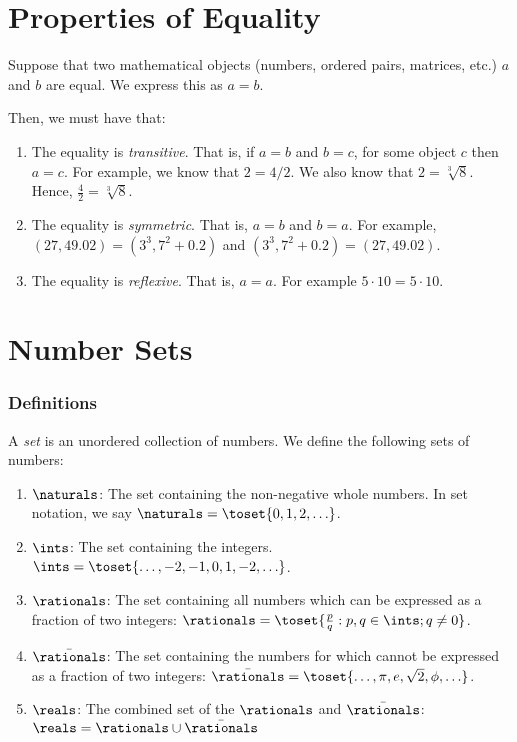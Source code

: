 \section{Properties of Equality}
  Suppose that two mathematical objects (numbers, ordered pairs, matrices, etc.)
  $a$ and $b$ are equal. We express this as $a = b$.

  Then, we must have that:
  \begin{enumerate}[label=(\alph*)]
    \item The equality is \emph{transitive}. That is, if $a = b$ and $b = c$, for some
    object $c$ then $a = c$. For example, we know that $2 = 4/2$. We also know that
    $2 = \sqrt[3]{8}$. Hence, $\frac{4}{2} = \sqrt[3]{8}$.

    \item The equality is \emph{symmetric}. That is, $a = b$ and $b = a$. For example,
    $(27, 49.02) = (3^3, 7^2 + 0.2)$ and $(3^3, 7^2 + 0.2) = (27, 49.02)$.

    \item The equality is \emph{reflexive}. That is, $a = a$. For example $5 \cdot 10 = 5 \cdot 10.$
  \end{enumerate}

\section{Number Sets}
  \subsubsection*{Definitions}
  A \emph{set} is an unordered collection of numbers. We define the following sets of numbers:
  \begin{enumerate}
    \item $\naturals$: The set containing the non-negative whole numbers. In set notation, we say $\naturals = \toset{0, 1, 2, \ldots}$.
    \item $\ints$: The set containing the integers. $\ints = \toset{\ldots, -2, -1, 0, 1, -2, \ldots}$.
    \item $\rationals$: The set containing all numbers which can be expressed as a fraction of two integers: $\rationals = \toset{\frac{p}{q}: p, q \in \ints; q \neq 0}$.
    \item $\bar{\rationals}$: The set containing the numbers for which cannot be expressed as a fraction of two integers:
    $\bar{\rationals} = \toset{\ldots, \pi, e, \sqrt{2}, \phi, \ldots}$.
    \item $\reals$: The combined set of the $\rationals$ and $\bar{\rationals}$: $\reals = \rationals \cup \bar{\rationals}$
  \end{enumerate}

